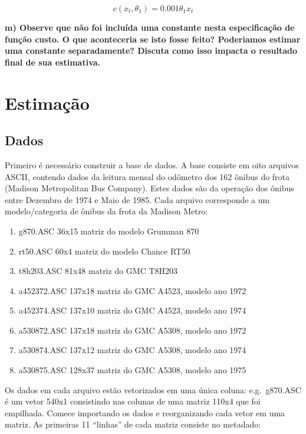 \documentclass[12pt,a4paper]{article}
\providecommand{\tightlist}{%
  \setlength{\itemsep}{0pt}\setlength{\parskip}{0pt}}
\begin{document}
\[
c (x_t, \theta_1) = 0.001 \theta_1 x_t
\]

\textbf{m) Observe que não foi incluída uma constante nesta
especificação de função custo. O que aconteceria se isto fosse feito?
Poderiamos estimar uma constante separadamente? Discuta como isso
impacta o resultado final de sua estimativa.}

\hypertarget{estimacao}{%
\section{Estimação}\label{estimacao}}

\hypertarget{dados}{%
\subsection{Dados}\label{dados}}

Primeiro é necessário construir a base de dados. A base consiste em oito
arquivos ASCII, contendo dados da leitura mensal do odômetro dos 162
ônibus do frota (Madison Metropolitan Bus Company). Estes dados são da
operação dos ônibus entre Dezembro de 1974 e Maio de 1985. Cada arquivo
corresponde a um modelo/categoria de ônibus da frota da Madison Metro:

\begin{enumerate}
\def\labelenumi{\arabic{enumi}.}
\tightlist
\item
  g870.ASC 36x15 matriz do modelo Grumman 870
\item
  rt50.ASC 60x4 matriz do modelo Chance RT50
\item
  t8h203.ASC 81x48 matriz do GMC T8H203
\item
  a452372.ASC 137x18 matriz do GMC A4523, modelo ano 1972
\item
  a452374.ASC 137x10 matriz do GMC A4523, modelo ano 1974
\item
  a530872.ASC 137x18 matriz do GMC A5308, modelo ano 1972
\item
  a530874.ASC 137x12 matriz do GMC A5308, modelo ano 1974
\item
  a530875.ASC 128x37 matriz do GMC A5308, modelo ano 1975
\end{enumerate}

Os dados em cada arquivo estão vetorizados em uma única coluna:
e.g.~g870.ASC é um vetor 540x1 consistindo nas colunas de uma matriz
110x4 que foi empilhada. Comece importando os dados e reorganizando cada
vetor em uma matriz. As primeiras 11 ``linhas'' de cada matriz consiste
no metadado:
\end{document}
